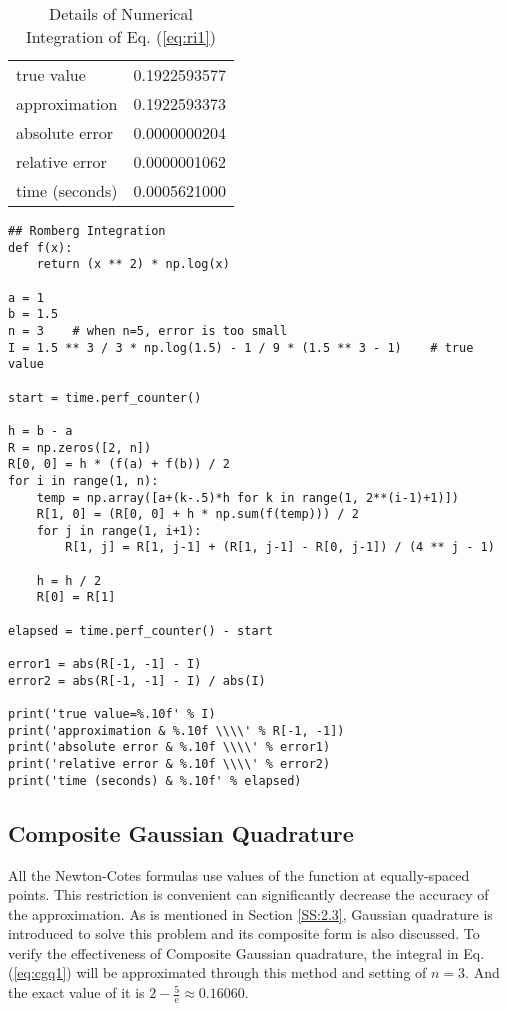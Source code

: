 \documentclass[preprint,12pt]{elsarticle}
\begin{document}
\begin{table}[h]
\centering
\begin{tabular}{l|l}
\hline
true value & 0.1922593577 \\
approximation & 0.1922593373 \\
absolute error & 0.0000000204 \\
relative error & 0.0000001062 \\
time (seconds) & 0.0005621000
\end{tabular}
\caption{Details of Numerical Integration of Eq. (\ref{eq:ri1})}
\label{tab:ri2}
\end{table}

\begin{lstlisting}
## Romberg Integration
def f(x):
    return (x ** 2) * np.log(x)

a = 1
b = 1.5
n = 3    # when n=5, error is too small
I = 1.5 ** 3 / 3 * np.log(1.5) - 1 / 9 * (1.5 ** 3 - 1)    # true value

start = time.perf_counter()

h = b - a
R = np.zeros([2, n])
R[0, 0] = h * (f(a) + f(b)) / 2
for i in range(1, n):
    temp = np.array([a+(k-.5)*h for k in range(1, 2**(i-1)+1)])
    R[1, 0] = (R[0, 0] + h * np.sum(f(temp))) / 2
    for j in range(1, i+1):
        R[1, j] = R[1, j-1] + (R[1, j-1] - R[0, j-1]) / (4 ** j - 1)
    
    h = h / 2
    R[0] = R[1]

elapsed = time.perf_counter() - start

error1 = abs(R[-1, -1] - I)
error2 = abs(R[-1, -1] - I) / abs(I)

print('true value=%.10f' % I)
print('approximation & %.10f \\\\' % R[-1, -1])
print('absolute error & %.10f \\\\' % error1)
print('relative error & %.10f \\\\' % error2)
print('time (seconds) & %.10f' % elapsed)
\end{lstlisting}

\subsection{Composite Gaussian Quadrature}
\label{SS:3.3}

All the Newton-Cotes formulas use values of the function at equally-spaced points. This restriction is convenient can significantly decrease the accuracy of the approximation. As is mentioned in Section \ref{SS:2.3}, Gaussian quadrature is introduced to solve this problem and its composite form is also discussed. To verify the effectiveness of Composite Gaussian quadrature, the integral in Eq. (\ref{eq:cgq1}) will be approximated through this method and setting of $n=3$. And the exact value of it is $2 - \frac{5}{\mathrm{e}} \approx 0.16060$.
\end{document}
